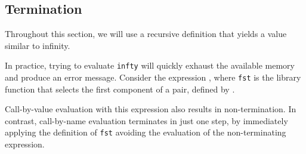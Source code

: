\subsection{Termination}\label{subsec:Termination}
Throughout this section, we will use a recursive definition that yields a value similar to infinity.

In practice, trying to evaluate \texttt{infty} will quickly exhaust the available memory and produce an error message.
Consider the expression , where \texttt{fst} is the library function that selects the first component of a pair, defined by .

Call-by-value evaluation with this expression also results in non-termination.
In contrast, call-by-name evaluation terminates in just one step, by immediately applying the definition of \texttt{fst} avoiding the evaluation of the non-terminating expression.

